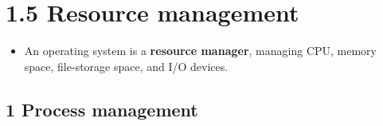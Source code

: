 \documentclass{article}
\begin{document}
\vspace{\baselineskip}

\newpage
\section*{1.5 Resource management}
\begin{itemize}
    \item An operating system is a \textbf{resource manager}, managing CPU, memory space, file-storage space, and I/O devices.
\end{itemize}

\subsection*{1 Process management}
\end{document}

